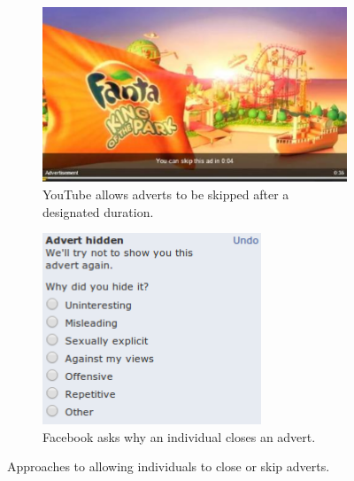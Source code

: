 	\begin{figure}[!h]
		\centering
		\begin{subfigure}[h]{0.6\textwidth}
			\centering
			\includegraphics[width=\textwidth]{images/youtube_ad.png}
			\caption{YouTube allows adverts to be skipped after a designated duration.}
			\label{fig:skip_youtube_ad}
		\end{subfigure}
		\begin{subfigure}[h]{0.39\textwidth}
			\centering
			\includegraphics[width=\textwidth]{images/facebook_ads.png}
			\caption{Facebook asks why an individual closes an advert.}
			\label{fig:close_facebook_ad}
		\end{subfigure}
		\caption{Approaches to allowing individuals to close or skip adverts.}
		\label{fig:advert_skipping}
	\end{figure}

